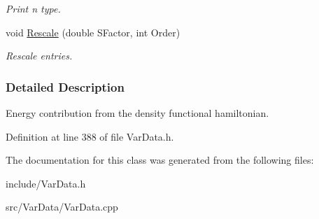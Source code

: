 \begin{DoxyCompactItemize}
\begin{DoxyCompactList}\small\item\em Print n type. \end{DoxyCompactList}\item 
void \hyperlink{classMatInt_a25d6afd486f86374d8d0903a2a245074}{Rescale} (double S\+Factor, int Order)\hypertarget{classMatInt_a25d6afd486f86374d8d0903a2a245074}{}\label{classMatInt_a25d6afd486f86374d8d0903a2a245074}

\begin{DoxyCompactList}\small\item\em Rescale entries. \end{DoxyCompactList}\end{DoxyCompactItemize}


\subsubsection{Detailed Description}
Energy contribution from the density functional hamiltonian. 

Definition at line 388 of file Var\+Data.\+h.



The documentation for this class was generated from the following files\+:\begin{DoxyCompactItemize}
\item 
include/Var\+Data.\+h\item 
src/\+Var\+Data/Var\+Data.\+cpp\end{DoxyCompactItemize}
